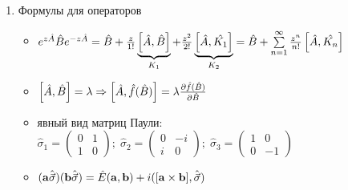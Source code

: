 \begin{enumerate}[label=\textbf{\underline{\arabic*.}}]
\begin{itemize}
        \end{itemize}
\item Формулы для операторов  \begin{itemize}
            \item
            $ e^{z\hat{A}}\hat{B}e^{-z\hat{A}} = \hat{B} + \frac{z}{1!}\underbrace{\left[ \hat{A}, \hat{B} \right]}_{K_1} + \frac{z^2}{2!}\underbrace{\left[ \hat{A}, \hat{K_1} \right]}_{K_2} = \hat{B}+\sum\limits_{n=1}^{\infty}\frac{z^n}{n!}\left[ \hat{A}, \hat{K_n} \right] $
            \item
            $ \left[ \hat{A}, \hat{B} \right]=\lambda \Rightarrow \left[ \hat{A}, \hat{f}(\hat{B}) \right]=\lambda \frac{\partial \hat{f}(\hat{B})}{\partial \hat{B}} $
            \item явный вид матриц Паули:
            $ \hat{\sigma}_1=\begin{pmatrix} 0&1\\1&0 \end{pmatrix};\; \hat{\sigma}_2=\begin{pmatrix} 0&-i\\i&0 \end{pmatrix};\; \hat{\sigma}_3=\begin{pmatrix} 1&0\\0&-1 \end{pmatrix} $
            \item
            $ (\mathbf{a}\hat{\vec{\sigma}})(\mathbf{b}\hat{\vec{\sigma}}) = \hat{E}(\mathbf{a},\mathbf{b}) + i([\mathbf{a}\times\mathbf{b}],\hat{\vec{\sigma}}) $
        \end{itemize}
\end{enumerate}

